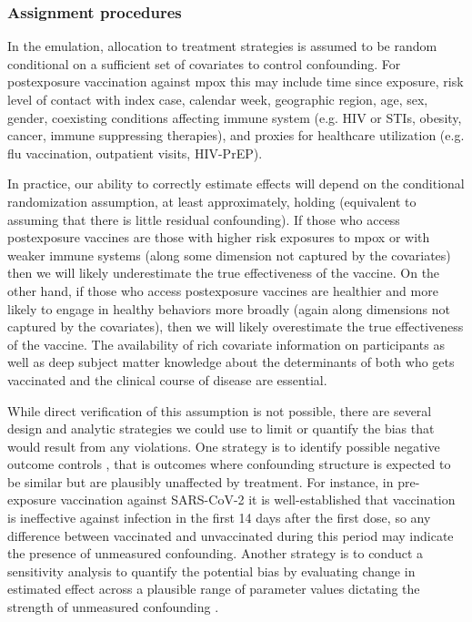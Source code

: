 \documentclass[11pt]{article}
\begin{document}
\subsubsection*{Assignment procedures}
In the emulation, allocation to treatment strategies is assumed to be random conditional on a sufficient set of covariates to control confounding. For postexposure vaccination against mpox this may include time since exposure, risk level of contact with index case, calendar week, geographic region, age, sex, gender, coexisting conditions affecting immune system (e.g. HIV or STIs, obesity, cancer, immune suppressing therapies), and proxies for healthcare utilization (e.g. flu vaccination, outpatient visits, HIV-PrEP).

In practice, our ability to correctly estimate effects will depend on the conditional randomization assumption, at least approximately, holding (equivalent to assuming that there is little residual confounding). If those who access postexposure vaccines are those with higher risk exposures to mpox or with weaker immune systems (along some dimension not captured by the covariates) then we will likely underestimate the true effectiveness of the vaccine. On the other hand, if those who access postexposure vaccines are healthier and more likely to engage in healthy behaviors more broadly (again along dimensions not captured by the covariates), then we will likely overestimate the true effectiveness of the vaccine. The availability of rich covariate information on participants as well as deep subject matter knowledge about the determinants of both who gets vaccinated and the clinical course of disease are essential.

While direct verification of this assumption is not possible, there are several design and analytic strategies we could use to limit or quantify the bias that would result from any violations. One strategy is to identify possible negative outcome controls \cite{chua_use_2020,lipsitch_negative_2010-1}, that is outcomes where confounding structure is expected to be similar but are plausibly unaffected by treatment. For instance, in pre-exposure vaccination against SARS-CoV-2 it is well-established that vaccination is ineffective against infection in the first 14 days after the first dose, so any difference between vaccinated and unvaccinated during this period may indicate the presence of unmeasured confounding.  Another strategy is to conduct a sensitivity analysis to quantify the potential bias by evaluating change in estimated effect across a plausible range of parameter values dictating the strength of unmeasured confounding \cite{robins_sensitivity_2000}. 
\end{document}
